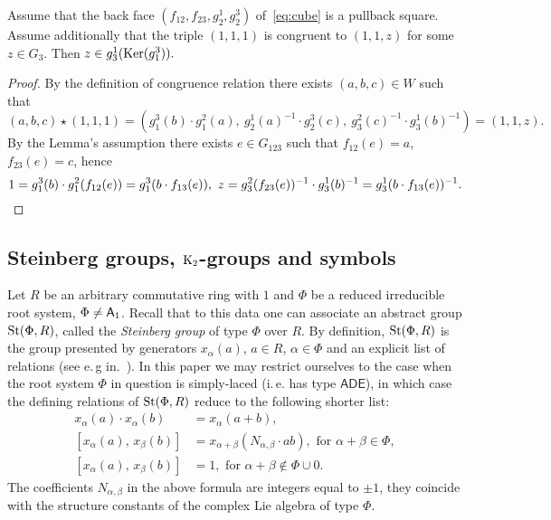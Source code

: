 \begin{lemma}\label{one-one-z} Assume that the back face $(f_{12}, f_{23}, g_2^1, g_2^3)$ of~\eqref{eq:cube} is a pullback square.
Assume additionally that the triple $(1, 1, 1)$ is congruent to $(1, 1, z)$ for some $z\in G_3$.
Then $z \in g_3^1(\operatorname{Ker}(g_1^3)).$ \end{lemma}
\begin{proof} By the definition of congruence relation there exists $(a, b, c)\in W$ such that
\[ (a, b, c) \star (1, 1, 1) = ( g_1^3(b) \cdot g_1^2(a),\ g_2^1(a)^{-1} \cdot g_2^3(c),\ g_3^2(c)^{-1} \cdot g_3^1(b)^{-1}) = (1,1,z). \]
By the Lemma's assumption there exists $e \in G_{123}$ such that $f_{12}(e) = a$, $f_{23}(e) = c$, hence
\[ 1 = g_1^3(b) \cdot g_1^2(f_{12}(e)) = g_1^3(b \cdot f_{13}(e)),\ z = g_3^2(f_{23}(e))^{-1} \cdot g_3^1(b)^{-1} = g_3^1(b \cdot f_{13}(e))^{-1}. \qedhere\] \end{proof}

\subsection{Steinberg groups, $\operatorname{K}_2$-groups and symbols}\label{subsec:steinberg-preliminaries}
Let $R$ be an arbitrary commutative ring with $1$ and $\Phi$ be a reduced irreducible root system, $\Phi \neq \mathsf{A}_1$.
Recall that to this data one can associate an abstract group $\operatorname{St}(\Phi, R)$, called the \textit{Steinberg group} of type $\Phi$ over $R$.
By definition, $\operatorname{St}(\Phi, R)$ is the group presented by generators $x_\alpha(a)$, $a \in R$, $\alpha \in \Phi$ and an explicit list of relations (see e.\,g in.~\cite{Ma69, Re75, St71}).
In this paper we may restrict ourselves to the case when the root system $\Phi$ in question is simply-laced (i.\,e. has type $\mathsf{ADE}$),
 in which case the defining relations of $\operatorname{St}(\Phi, R)$ reduce to the following shorter list:
\begin{align}
x_{\alpha}(a)\cdot x_{\alpha}(b)&=x_{\alpha}(a+b), \tag{R1} \label{x-additivity}\\
[x_{\alpha}(a),\,x_{\beta}(b)]  &=x_{\alpha+\beta}(N_{\alpha,\beta} \cdot ab),\text{ for }\alpha+\beta\in\Phi, \tag{R2} \label{R2} \\
[x_{\alpha}(a),\,x_{\beta}(b)]  &=1,\text{ for }\alpha+\beta\not\in\Phi\cup0. \tag{R3} \label{R3}
\end{align}
The coefficients $N_{\alpha,\beta}$ in the above formula are integers equal to $\pm 1$, they coincide with the structure constants of the complex Lie algebra of type $\Phi$.

